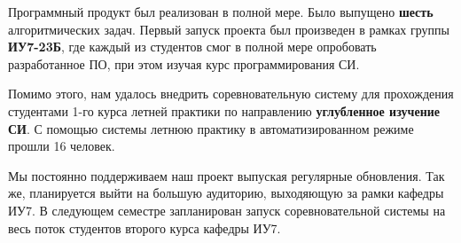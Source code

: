 \documentclass[a4paper,12pt]{article}
\begin{document}
\noindent Программный продукт был реализован в полной мере. Было выпущено \textbf{шесть} алгоритмических задач. Первый запуск проекта был произведен в рамках группы \textbf{ИУ7-23Б}, где каждый из студентов смог в полной мере опробовать разработанное ПО, при этом изучая курс программирования СИ. \newline

\noindent Помимо этого, нам удалось внедрить соревновательную систему для прохождения студентами 1-го курса летней практики по направлению \textbf{углубленное изучение СИ}. С помощью системы летнюю практику в автоматизированном режиме прошли 16 человек. \newline

\noindent Мы постоянно поддерживаем наш проект выпуская регулярные обновления. Так же, планируется выйти на большую аудиторию, выходяющую за рамки кафедры ИУ7. В следующем семестре запланирован запуск соревновательной системы на весь поток студентов второго курса кафедры ИУ7.
\end{document}
